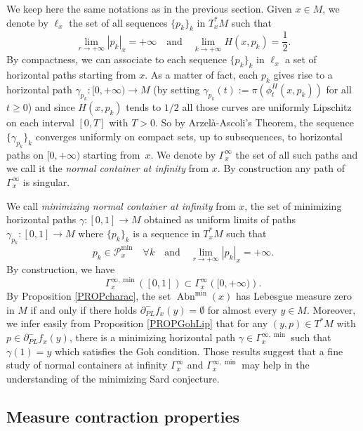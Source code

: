\documentclass[JEP,XML,SOM,Unicode,NoFloatCountersInSection,published]{cedram}
\DeclareMathOperator{\Abn}{Abn}
\theoremstyle{definition}
\begin{document}
We keep here the same notations as in the previous section. Given $x\in M$, we denote by $\ell_x$ the set of all sequences $\{p_k\}_k$ in $T_x^*M$ such that
\[
\lim_{r\to + \infty} |p_k|_{x} = +\infty \quad \text{and} \quad \lim_{k\to +\infty} H(x,p_k) = \frac{1}{2}.
\]
By compactness, we can associate to each sequence $\{p_k\}_k$ in $\ell_x$ a set of horizontal paths starting from $x$. As a matter of fact, each $p_k$ gives rise to a horizontal path $\gamma_{p_k}:[0,+\infty) \to M$ (by setting $\gamma_{p_k}(t):=\pi(\phi_t^H(x,p_k))$ for all $t\geq 0$) and since $H(x,p_k)$ tends to $1/2$ all those curves are uniformly Lipschitz on each interval $[0,T]$ with $T>0$. So by Arzelà-Ascoli's Theorem, the sequence $\{\gamma_{p_k}\}_k$ converges uniformly on compact sets, up to subsequences, to horizontal paths on $[0,+\infty)$ starting from~$x$. We denote by $\Gamma_x^{\infty}$ the set of all such paths and we call it the {\it normal container at infinity} from $x$. By construction any path of $\Gamma_x^{\infty}$ is singular.

We call {\it minimizing normal container at infinity } from $x$, the set of minimizing horizontal paths $\gamma:[0,1] \to M$ obtained as uniform limits of paths $\gamma_{p_k}:[0,1] \to M$ where $\{p_k\}_k$ is a sequence in $T_x^*M$ such that
\[
p_k \in \mathcal{P}_x^{\min} \quad \forall k \quad \text{and} \quad \lim_{r\to + \infty} |p_k|_{x} = +\infty.
\]
By construction, we have
\[
\Gamma_x^{\infty,\min}([0,1]) \subset \Gamma_x^{\infty} \left([0,+\infty)\right).
\]
By Proposition \ref{PROPcharac}, the set $\Abn^{\min}(x)$ has Lebesgue measure zero in $M$ if and only if there holds $\partial^-_{PL}f_x(y)= \emptyset$ for almost every $y\in M$. Moreover, we infer easily from Proposition \ref{PROPGohLip} that for any $(y,p) \in T^*M$ with $p \in \partial^-_{PL}f_x(y)$, there is a minimizing horizontal path $\gamma \in \Gamma_x^{\infty,\min}$ such that $\gamma(1)=y$ which satisfies the Goh condition. Those results suggest that a fine study of normal containers at infinity $\Gamma_x^{\infty}$ and $\Gamma_x^{\infty,\min}$ may help in the understanding of the minimizing Sard conjecture.

\subsection{Measure contraction properties}
\end{document}
